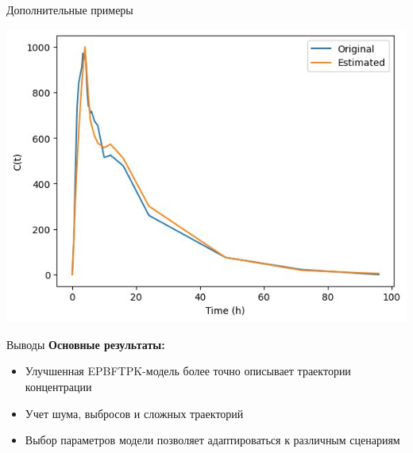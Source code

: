 \documentclass[12pt]{beamer}
\begin{document}
\begin{frame}{Дополнительные примеры}
\begin{minipage}{0.45\linewidth}
		\includegraphics[width=\linewidth]{results/4.jpg}
	\end{minipage}
\end{frame}

\begin{frame}{Выводы}
	\textbf{Основные результаты:}
	\begin{itemize}
		\item Улучшенная EPBFTPK-модель более точно описывает траектории концентрации
		\item Учет шума, выбросов и сложных траекторий
		\item Выбор параметров модели позволяет адаптироваться к различным сценариям
	\end{itemize}
\end{frame}


\begin{frame}
	
\end{frame}
\end{document}
